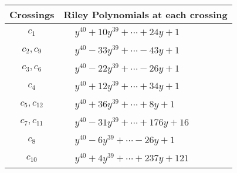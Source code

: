 \documentclass[1p]{elsarticle_modified}
\theoremstyle{definition}
\begin{document}
\begin{tabular}{m{50pt}|m{274pt}}
Crossings & \hspace{64pt}Riley Polynomials at each crossing \\
\hline $$\begin{aligned}c_{1}\end{aligned}$$&$\begin{aligned}
&y^{40}+10 y^{39}+\cdots+24 y+1
\end{aligned}$\\
\hline $$\begin{aligned}c_{2},c_{9}\end{aligned}$$&$\begin{aligned}
&y^{40}-33 y^{39}+\cdots-43 y+1
\end{aligned}$\\
\hline $$\begin{aligned}c_{3},c_{6}\end{aligned}$$&$\begin{aligned}
&y^{40}-22 y^{39}+\cdots-26 y+1
\end{aligned}$\\
\hline $$\begin{aligned}c_{4}\end{aligned}$$&$\begin{aligned}
&y^{40}+12 y^{39}+\cdots+34 y+1
\end{aligned}$\\
\hline $$\begin{aligned}c_{5},c_{12}\end{aligned}$$&$\begin{aligned}
&y^{40}+36 y^{39}+\cdots+8 y+1
\end{aligned}$\\
\hline $$\begin{aligned}c_{7},c_{11}\end{aligned}$$&$\begin{aligned}
&y^{40}-31 y^{39}+\cdots+176 y+16
\end{aligned}$\\
\hline $$\begin{aligned}c_{8}\end{aligned}$$&$\begin{aligned}
&y^{40}-6 y^{39}+\cdots-26 y+1
\end{aligned}$\\
\hline $$\begin{aligned}c_{10}\end{aligned}$$&$\begin{aligned}
&y^{40}+4 y^{39}+\cdots+237 y+121
\end{aligned}$\\
\hline
\end{tabular}\\~\\
\end{document}
